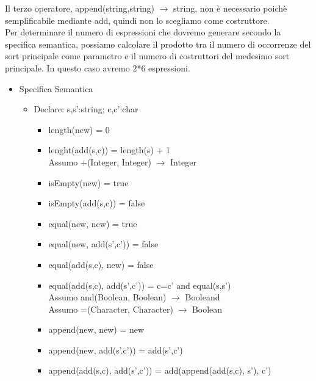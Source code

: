 \documentclass{article}
\begin{document}
	Il terzo operatore, append(string,string) $\rightarrow$ string, non è necessario poichè semplificabile mediante add, quindi non lo scegliamo come costruttore.
	\vspace*{\baselineskip}	\\
	Per determinare il numero di espressioni che dovremo generare secondo la specifica semantica, possiamo calcolare il prodotto tra il numero di occorrenze del sort principale come parametro e il numero di costruttori del medesimo sort principale.
	In questo caso avremo 2*6 espressioni.
	\begin{itemize}
		\item Specifica Semantica
		\begin{itemize}
			\item Declare: s,s':string; c,c':char
			\begin{itemize}
				\item length(new) = 0
				\item lenght(add(s,c)) = length(s) + 1 \\
				Assumo +(Integer, Integer) $\rightarrow$ Integer
				\item isEmpty(new) = true
				\item isEmpty(add(s,c)) = false
				\item equal(new, new) = true
				\item equal(new, add(s',c')) = false
				\item equal(add(s,c), new) = false
				\item equal(add(s,c), add(s',c')) = c=c' and equal(s,s') \\
				Assumo and(Boolean, Boolean) $\rightarrow$ Booleand \\
				Assumo =(Character, Character) $\rightarrow$ Boolean
				\item append(new, new) = new
				\item append(new, add(s'.c')) = add(s',c')
				\item append(add(s,c), add(s',c')) = add(append(add(s,c), s'), c')
			\end{itemize}
		\end{itemize}
	\end{itemize}
	\newpage
\end{document}
